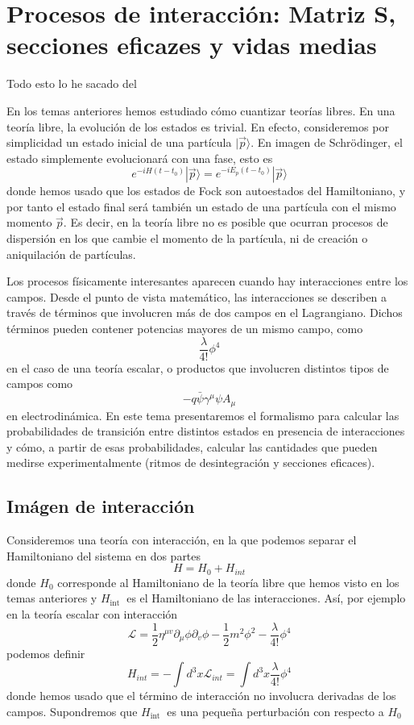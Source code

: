 \setchapterpreamble[u]{\margintoc}
\chapter{Procesos de interacción: Matriz S, secciones eficazes y vidas medias}

\begin{center}
  \large Todo esto lo he sacado del \cite{Dobdado}
\end{center}
En los temas anteriores hemos estudiado cómo cuantizar teorías libres. En una teoría libre, la evolución de los estados es trivial. En efecto, consideremos por simplicidad un estado inicial de una partícula $|\vec{p}\rangle$. En imagen de Schrödinger, el estado simplemente evolucionará con una fase, esto es
$$
e^{-i H\left(t-t_{0}\right)}|\vec{p}\rangle=e^{-i E_{p}\left(t-t_{0}\right)}|\vec{p}\rangle
$$
donde hemos usado que los estados de Fock son autoestados del Hamiltoniano, y por tanto el estado final será también un estado de una partícula con el mismo momento $\vec{p}$. Es decir, en la teoría libre no es posible que ocurran procesos de dispersión en los que cambie el momento de la partícula, ni de creación o aniquilación de partículas.

Los procesos físicamente interesantes aparecen cuando hay interacciones entre los campos. Desde el punto de vista matemático, las interacciones se describen a través de términos que involucren más de dos campos en el Lagrangiano. Dichos términos pueden contener potencias mayores de un mismo campo, como
$$
\frac{\lambda}{4!} \phi^{4}
$$
en el caso de una teoría escalar, o productos que involucren distintos tipos de campos como
$$
-q \bar{\psi} \gamma^{\mu} \psi A_{\mu}
$$
en electrodinámica.
En este tema presentaremos el formalismo para calcular las probabilidades de transición entre distintos estados en presencia de interacciones y cómo, a partir de esas probabilidades, calcular las cantidades que pueden medirse experimentalmente (ritmos de desintegración y secciones eficaces).
\section{Imágen de interacción}
Consideremos una teoría con interacción, en la que podemos separar el Hamiltoniano del sistema en dos partes
$$
\begin{equation*}
H=H_{0}+H_{i n t} \tag{7.1}
\end{equation*}
$$
donde $H_{0}$ corresponde al Hamiltoniano de la teoría libre que hemos visto en los temas anteriores y $H_{\text {int }}$ es el Hamiltoniano de las interacciones. Así, por ejemplo en la teoría escalar con interacción
$$
\begin{equation*}
\mathscr{L}=\frac{1}{2} \eta^{\mu v} \partial_{\mu} \phi \partial_{v} \phi-\frac{1}{2} m^{2} \phi^{2}-\frac{\lambda}{4!} \phi^{4} \tag{7.2}
\end{equation*}
$$
podemos definir
$$
\begin{equation*}
H_{i n t}=-\int d^{3} x \mathscr{L}_{i n t}=\int d^{3} x \frac{\lambda}{4!} \phi^{4} \tag{7.3}
\end{equation*}
$$
donde hemos usado que el término de interacción no involucra derivadas de los campos. Supondremos que $H_{\text {int }}$ es una pequeña perturbación con respecto a $H_{0}$
